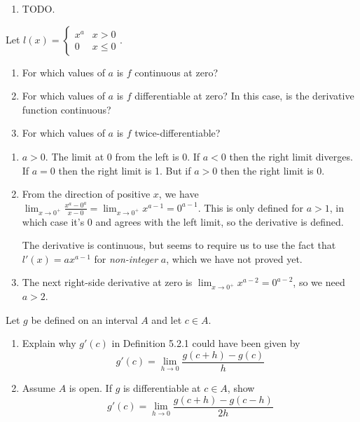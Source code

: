 \documentclass{oxmathproblems}
\begin{document}
\begin{questions}
\begin{solution}
\begin{enumerate}[label=(\alph*)]
    $h(x)-h(a)=l(x)(x-a)$ for all $x \in A$ by definition.

    \item TODO.
  \end{enumerate}
\end{solution}

\miquestion Let $ l(x) = \begin{cases} x^a & x > 0\\0 & x \leq 0 \end{cases}$.
\begin{enumerate}[label=(\alph*)]
  \item For which values of $a$ is $f$ continuous at zero?
  \item For which values of $a$ is $f$ differentiable at zero? In this case, is the derivative function continuous?
  \item For which values of $a$ is $f$ twice-differentiable?
\end{enumerate}

\begin{solution}
  \begin{enumerate}[label=(\alph*)]
    \item $a > 0$. The limit at 0 from the left is 0. If $a < 0$ then the right limit diverges. If $a=0$ then the right limit is 1. But if $a > 0$ then the right limit is 0.
    \item From the direction of positive $x$, we have $\lim_{x \to 0^{+}}\frac{x^a-0^a}{x-0}=\lim_{x \to 0^{+}}x^{a-1} = 0^{a-1}$. This is only defined for $a > 1$, in which case it's 0 and
    agrees with the left limit, so the derivative is defined.

    The derivative is continuous, but seems to require us to use the fact that $l'(x)=ax^{a-1}$ for \textit{non-integer} $a$, which we have not proved yet.
    \item The next right-side derivative at zero is $\lim_{x \to 0^{+}} x^{a-2} = 0^{a-2}$, so we need $a > 2$.
  \end{enumerate}
\end{solution}

\miquestion Let $g$ be defined on an interval $A$ and let $c \in A$.
\begin{enumerate}[label=(\alph*)]
  \item Explain why $g'(c)$ in Definition 5.2.1 could have been given by
  \[g'(c) = \lim_{h \to 0}\frac{g(c+h) - g(c)}{h}\]
  \item Assume $A$ is open. If $g$ is differentiable at $c \in A$, show
  \[g'(c) = \lim_{h \to 0}\frac{g(c+h) - g(c-h)}{2h}\]
\end{enumerate}


\end{questions}
\end{document}
